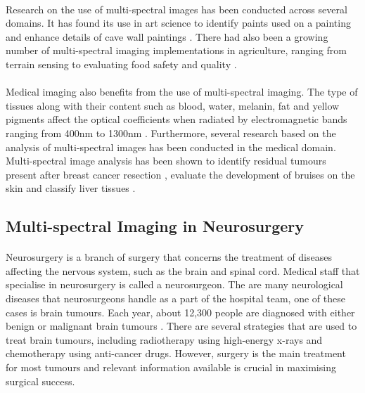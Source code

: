 \documentclass[12pt]{article}
\begin{document}
    \paragraph{}
    Research on the use of multi-spectral images has been conducted across several domains. It has found its use in art science to identify paints used on a painting \cite{pelagotti_multispectral_2008} and enhance details of cave wall paintings \cite{legnaioli_recovery_2013}. There had also been a growing number of multi-spectral imaging implementations in agriculture, ranging from terrain sensing \cite{berni_thermal_2009} to evaluating food safety and quality \cite{qin_hyperspectral_2013}.

    \paragraph{}
    Medical imaging also benefits from the use of multi-spectral imaging. The type of tissues along with their content such as blood, water, melanin, fat and yellow pigments affect the optical coefficients when radiated by electromagnetic bands ranging from 400nm to 1300nm \cite{jacques_optical_2013}. Furthermore, several research based on the analysis of multi-spectral images has been conducted in the medical domain. Multi-spectral image analysis has been shown to identify residual tumours present after breast cancer resection \cite{panasyuk_medical_2007}, evaluate the development of bruises on the skin \cite{randeberg_hyperspectral_2006} and classify liver tissues \cite{hashimoto_tissue_2017}.

    \subsection*{Multi-spectral Imaging in Neurosurgery}
    \paragraph{}
    Neurosurgery is a branch of surgery that concerns the treatment of diseases affecting the nervous system, such as the brain and spinal cord. Medical staff that specialise in neurosurgery is called a neurosurgeon. The are many neurological diseases that neurosurgeons handle as a part of the hospital team, one of these cases is brain tumours. Each year, about 12,300 people are diagnosed with either benign or malignant brain tumours \cite{cruk_brain_2023}. There are several strategies that are used to treat brain tumours, including radiotherapy using high-energy x-rays and chemotherapy using anti-cancer drugs. However, surgery is the main treatment for most tumours \cite{bush_current_2017, cruk_brain_2023} and relevant information available is crucial in maximising surgical success.
\end{document}
